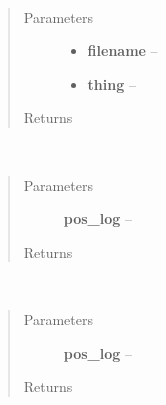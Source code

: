 \documentclass[letterpaper,10pt,english]{sphinxmanual}
\begin{document}
\begin{fulllineitems}
\label{index:aietes.Tools.mkpickle}~\begin{quote}\begin{description}
\item[{Parameters}] \leavevmode\begin{itemize}
\item {} 
\textbf{filename} -- 

\item {} 
\textbf{thing} -- 

\end{itemize}

\item[{Returns}] \leavevmode


\end{description}\end{quote}

\end{fulllineitems}


\begin{fulllineitems}
\label{index:aietes.Tools.named_log}~\begin{quote}\begin{description}
\item[{Parameters}] \leavevmode
\textbf{pos\_log} -- 

\item[{Returns}] \leavevmode


\end{description}\end{quote}

\end{fulllineitems}


\begin{fulllineitems}
\label{index:aietes.Tools.node_ids}~\begin{quote}\begin{description}
\item[{Parameters}] \leavevmode
\textbf{pos\_log} -- 

\item[{Returns}] \leavevmode


\end{description}\end{quote}

\end{fulllineitems}
\end{document}
